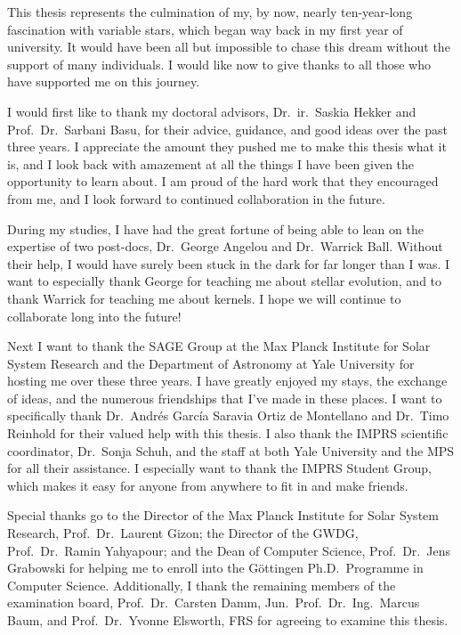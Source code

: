 This thesis represents the culmination of my, by now, nearly ten-year-long fascination with variable stars, which began way back in my first year of university. 
It would have been all but impossible to chase this dream without the support of many individuals. 
I would like now to give thanks to all those who have supported me on this journey. 

I would first like to thank my doctoral advisors, Dr.\ ir.\ Saskia Hekker and Prof.\ Dr.\ Sarbani Basu, for their advice, guidance, and good ideas over the past three years. 
I appreciate the amount they pushed me to make this thesis what it is, and I look back with amazement at all the things I have been given the opportunity to learn about. 
I am proud of the hard work that they encouraged from me, and I look forward to continued collaboration in the future. 

During my studies, I have had the great fortune of being able to lean on the expertise of two post-docs, Dr.\ George Angelou and Dr.\ Warrick Ball. 
Without their help, I would have surely been stuck in the dark for far longer than I was. 
I want to especially thank George for teaching me about stellar evolution, and to thank Warrick for teaching me about kernels. 
I hope we will continue to collaborate long into the future! 

Next I want to thank the SAGE Group at the Max Planck Institute for Solar System Research and the Department of Astronomy at Yale University for hosting me over these three years. 
I have greatly enjoyed my stays, the exchange of ideas, and the numerous friendships that I've made in these places. 
I want to specifically thank Dr.\ Andr\'es Garc\'ia Saravia Ortiz de Montellano and Dr.\ Timo Reinhold for their valued help with this thesis. 
I also thank the IMPRS scientific coordinator, Dr.\ Sonja Schuh, and the staff at both Yale University and the MPS for all their assistance. 
I especially want to thank the IMPRS Student Group, which makes it easy for anyone from anywhere to fit in and make friends. 

Special thanks go to the Director of the Max Planck Institute for Solar System Research, Prof.\ Dr.\ Laurent Gizon; the Director of the GWDG, Prof.\ Dr.\ Ramin Yahyapour; and the Dean of Computer Science, Prof.\ Dr.\ Jens Grabowski for helping me to enroll into the 
G\"ottingen Ph.D.\ Programme in Computer Science. 
Additionally, I thank the remaining members of the examination board, Prof.\ Dr.\ Carsten Damm, Jun.\ Prof.\ Dr.\ Ing.\ Marcus Baum, and Prof.\ Dr.\ Yvonne Elsworth, FRS for agreeing to examine this thesis. 

